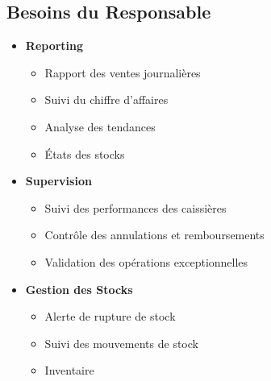 \documentclass[14pt,a4paper]{report}
\begin{document}
\subsection{Besoins du Responsable}
\begin{itemize}
    \item \textbf{Reporting}
        \begin{itemize}
            \item Rapport des ventes journalières
            \item Suivi du chiffre d'affaires
            \item Analyse des tendances
            \item États des stocks
        \end{itemize}
    \item \textbf{Supervision}
        \begin{itemize}
            \item Suivi des performances des caissières
            \item Contrôle des annulations et remboursements
            \item Validation des opérations exceptionnelles
        \end{itemize}
    \item \textbf{Gestion des Stocks}
        \begin{itemize}
            \item Alerte de rupture de stock
            \item Suivi des mouvements de stock
            \item Inventaire
        \end{itemize}
\end{itemize}
\end{document}
